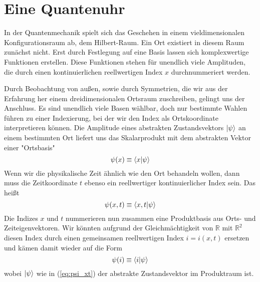 \documentclass[12pt]{article}
\begin{document}
\section{Eine Quantenuhr}

In der Quantenmechanik spielt sich das Geschehen in einem vieldimensionalen Konfigurationsraum ab, dem Hilbert-Raum. Ein Ort existiert in diesem Raum zunächst nicht. Erst durch Festlegung auf eine Basis lassen sich komplexwertige Funktionen erstellen. Diese Funktionen stehen für unendlich viele Amplituden, die durch einen kontinuierlichen reellwertigen Index $x$ durchnummeriert werden.

Durch Beobachtung von außen, sowie durch Symmetrien, die wir aus der Erfahrung her einem dreidimensionalen Ortsraum zuschreiben, gelingt uns der Anschluss. Es sind unendlich viele Basen wählbar, doch nur bestimmte Wahlen führen zu einer Indexierung, bei der wir den Index als Ortskoordinate interpretieren können. Die Amplitude eines abstrakten Zustandsvektors $\ket{\psi}$ an einem bestimmten Ort liefert uns das Skalarprodukt mit dem abstrakten Vektor einer "Ortsbasis"
\begin{equation} 
\psi(x) \equiv \bra{x}\ket{\psi} 
\end{equation}
Wenn wir die physikalische Zeit ähnlich wie den Ort behandeln wollen, dann muss die Zeitkoordinate $t$ ebenso ein reellwertiger kontinuierlicher Index sein. Das heißt
\begin{equation} 
\label{eq:psi_xt}
\psi(x,t) \equiv \bra{x,t}\ket{\psi} 
\end{equation}
Die Indizes $x$ und $t$ nummerieren nun zusammen eine Produktbasis aus Orts- und Zeiteigenvektoren. Wir könnten aufgrund der Gleichmächtigkeit von $\mathbb{R}$ mit $\mathbb{R}^2$ diesen Index durch einen gemeinsamen reellwertigen Index $i = i(x,t)$ ersetzen und kämen damit wieder auf die Form
\begin{equation}
\psi(i) \equiv \bra{i}\ket{\psi} 
\end{equation}
wobei $\ket{\psi}$ wie in (\ref{eq:psi_xt}) der abstrakte Zustandsvektor im Produktraum ist.
\end{document}
